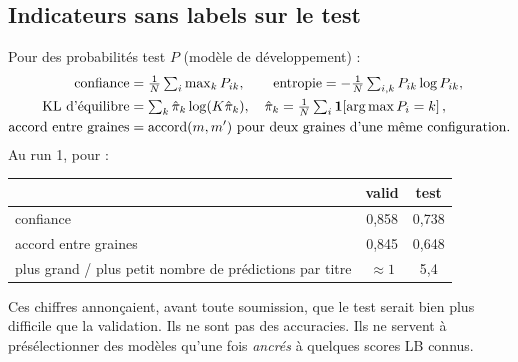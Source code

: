 \subsection{Indicateurs sans labels sur le test}
Pour des probabilités test $P$ (modèle de développement) :
\begin{align}
\text{confiance}&=\tfrac1N\textstyle\sum_i\max_kP_{ik},\qquad
\text{entropie}=-\tfrac1N\sum_{i,k}P_{ik}\log P_{ik},\\
\text{KL d'équilibre}&=\textstyle\sum_k\hat\pi_k\log(K\hat\pi_k),\quad \hat\pi_k=\tfrac1N\sum_i\mathbf{1}\!\left[\arg\max P_i=k\right],\\
\text{accord entre graines}&=\text{accord}(m,m')\ \text{pour deux graines d'une même configuration.}
\end{align}
Au run 1, pour  :
\begin{center}\small
\begin{tabular}{lcc}
\toprule
& valid & test\\
\midrule
confiance & 0,858 & 0,738\\
accord entre graines & 0,845 & 0,648\\
plus grand / plus petit nombre de prédictions par titre & $\approx1$ & 5,4\\
\bottomrule
\end{tabular}
\end{center}
Ces chiffres annonçaient, avant toute soumission, que le test serait bien plus difficile que la validation. Ils ne sont pas des accuracies. Ils ne servent à présélectionner des modèles qu'une fois \emph{ancrés} à quelques scores LB connus.
